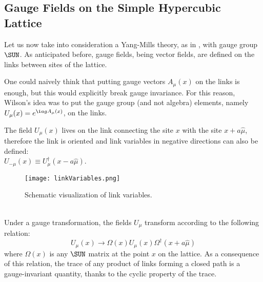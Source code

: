 \subsection{Gauge Fields on the Simple Hypercubic Lattice}
Let us now take into consideration a Yang-Mills theory, as in , with gauge group $\SUN$.
As anticipated before, gauge fields, being vector fields, are defined on the links between sites of the lattice.

One could naively think that putting gauge vectors $A_\mu(x)$ on the links is enough, but this would explicitly break gauge invariance.
For this reason, Wilson's idea was to put the gauge group (and not algebra) elements, namely $U_\mu(x) = e^{\i a g A_\mu(x)}$, on the links.

The field $U_\mu(x)$ lives on the link connecting the site $x$ with the site $x+a\hat\mu$, therefore the link is oriented and link variables in negative directions can also be defined:\\
$U_{-\mu}(x) \equiv U^\dagger_\mu(x-a\hat\mu)$.
\begin{figure}[!htbp]
    \texttt{[image: linkVariables.png]}
    \caption{Schematic visualization of link variables.}
    \label{1F:LinkVariables}
\end{figure}\\
Under a gauge transformation, the fields $U_\mu$ transform according to the following relation:
\begin{equation}
    U_\mu(x)\rightarrow \Omega(x) U_\mu(x) \Omega^\dagger(x+a\hat\mu) \label{1:GaugeTransformLinkVariable}
\end{equation}
where $\Omega(x)$ is any $\SUN$ matrix at the point $x$ on the lattice.
As a consequence of this relation, the trace of any product of links forming a closed path is a gauge-invariant quantity, thanks to the cyclic property of the trace.

